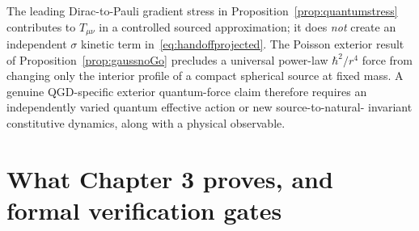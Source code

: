 \documentclass[11pt,a4paper,oneside]{report}
\numberwithin{equation}{chapter}
\theoremstyle{definition}\newtheorem{definition}[theorem]{Definition}
\theoremstyle{remark}\newtheorem{remark}[theorem]{Remark}
\begin{document}
The leading Dirac-to-Pauli gradient stress in
Proposition~\ref{prop:quantumstress} contributes to $T_{\mu\nu}$ in a
controlled sourced approximation; it does \emph{not} create an
independent $\sigma$ kinetic term in~\eqref{eq:handoffprojected}.
The Poisson exterior result of Proposition~\ref{prop:gaussnoGo}
precludes a universal power-law $\hbar^2/r^4$ force from changing
only the interior profile of a compact spherical source at fixed mass.
A genuine QGD-specific exterior quantum-force claim therefore requires
an independently varied quantum effective action or new source-to-natural-
invariant constitutive dynamics, along with a physical observable.

\section{What Chapter 3 proves, and formal verification gates}\label{sec:proofledger}
\end{document}
